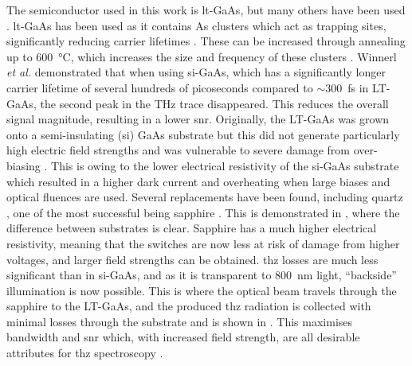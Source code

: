The semiconductor used in this work is \acrfull{lt}-GaAs, but many others have been used \cite{Burford2017, Bacon2021, Murakumo2016, Dietz2013, Gu2002, Bertulis2006, Collier2016}. \acrshort{lt}\nobreakdash-GaAs has been used as it contains As clusters which act as trapping sites, significantly reducing carrier lifetimes \cite{Segschneider1997}. These can be increased through annealing up to \SI{600}{\degreeCelsius}, which increases the size and frequency of these clusters \cite{Gregory2003}. Winnerl \textit{et al.} \cite{Winnerl2008} demonstrated that when using \acrshort{si}\nobreakdash-GaAs, which has a significantly longer carrier lifetime of several hundreds of picoseconds compared to \(\sim\)\SI{300}{\femto\second} in LT-GaAs, the second peak in the THz trace disappeared. This reduces the overall signal magnitude, resulting in a lower \acrshort{snr}.
Originally, the LT\nobreakdash-GaAs was grown onto a semi\nobreakdash-insulating (\acrshort{si}) GaAs substrate but this did not generate particularly high electric field strengths and was vulnerable to severe damage from over\nobreakdash-biasing \cite{Bacon2017}. This is owing to the lower electrical resistivity of the \acrshort{si}-GaAs substrate which resulted in a higher dark current and overheating when large biases and optical fluences are used. Several replacements have been found, including quartz \cite{Bacon2017}, one of the most successful being sapphire \cite{Russell2013, Bacon2021}. This is demonstrated in , where the difference between substrates is clear. Sapphire has a much higher electrical resistivity, meaning that the switches are now less at risk of damage from higher voltages, and larger field strengths can be obtained. \acrshort{thz} losses are much less significant than in \acrshort{si}\nobreakdash-GaAs, and as it is transparent to \SI{800}{nm} light, “backside” illumination is now possible. This is where the optical beam travels through the sapphire to the LT\nobreakdash-GaAs, and the produced \acrshort{thz} radiation is collected with minimal losses through the substrate and is shown in . This maximises bandwidth and \acrshort{snr} which, with increased field strength, are all desirable attributes for \acrshort{thz} spectroscopy \cite{Bacon2017}.


